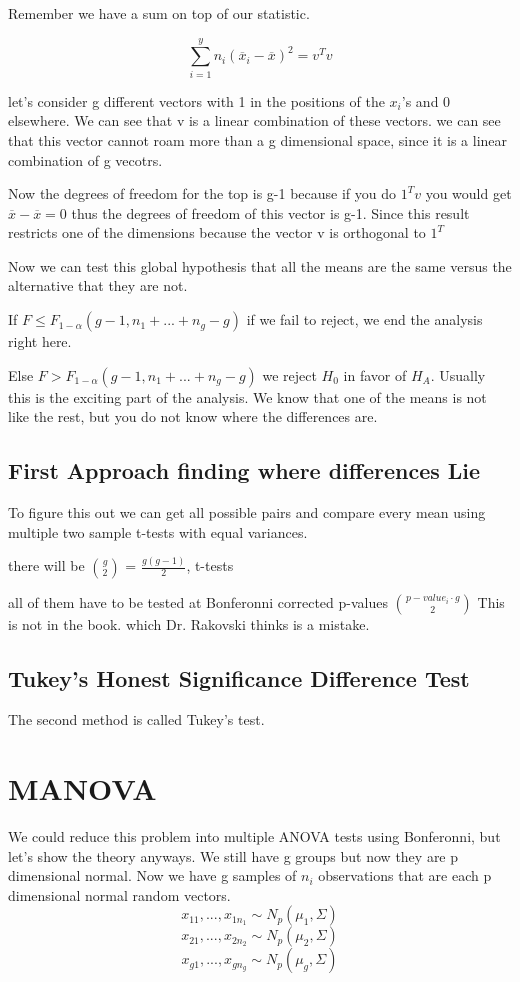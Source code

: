 Remember we have a sum on top of our statistic.

\[\displaystyle\sum_{i=1}^{y}n_i(\overline{x}_i-\overline{x})^2 = v^Tv\] 

let's consider g different vectors with 1 in the positions of the $x_i$'s and 0 elsewhere. We can see that v is a linear combination of these vectors. we can see that this vector cannot roam more than a g dimensional space, since it is a linear combination of g vecotrs. 

Now the degrees of freedom for the top is g-1 because if you do $1^Tv$ you would get $\overline{x}-\overline{x}=0$ thus the degrees of freedom of this vector is g-1. Since this result restricts one of the dimensions because the vector v is orthogonal to $1^T$

Now we can test this global hypothesis that all the means are the same versus the alternative that they are not.

If $F \leq F_{1-\alpha}(g-1,n_1+...+n_g-g)$ if we fail to reject, we end the analysis right here.

Else $F > F_{1-\alpha}(g-1,n_1+...+n_g-g)$ we reject $H_0$ in favor of $H_A$. Usually this is the exciting part of the analysis. We know that one of the means is not like the rest, but you do not know where the differences are.
\subsection{First Approach finding where differences Lie}
To figure this out we can get all possible pairs and compare every mean using multiple two sample t-tests with equal variances.

there will be ${g \choose 2}$ = $\frac  {g(g-1)}{2}$, t-tests

all of them have to be tested at Bonferonni corrected p-values $p-value_i\cdot g\choose 2$
This is not in the book. which Dr. Rakovski thinks is a mistake.

\subsection{Tukey's Honest Significance Difference Test}
The second method is called Tukey's test.

\section{MANOVA}
We could reduce this problem into multiple ANOVA tests using Bonferonni, but let's show the theory anyways.
We still have g groups but now they are p dimensional normal. 
Now we have g samples of $n_i$ observations that are each p dimensional normal random vectors.
\[x_{11},...,x_{1n_1}\sim N_p(\mu_1,\Sigma)\]
\[x_{21},...,x_{2n_2}\sim N_p(\mu_2,\Sigma)\]
\[x_{g1},...,x_{gn_g}\sim N_p(\mu_g,\Sigma)\]


